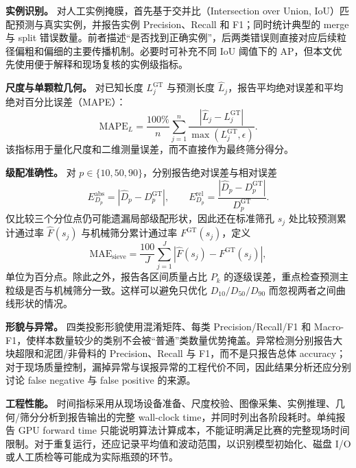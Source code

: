 \textbf{实例识别。} 对人工实例掩膜，首先基于交并比（Intersection over Union, IoU）匹配预测与真实实例，并报告实例 Precision、Recall 和 F1；同时统计典型的 merge 与 split 错误数量。前者描述“是否找到正确实例”，后两类错误则直接对应后续粒径偏粗和偏细的主要传播机制。必要时可补充不同 IoU 阈值下的 AP，但本文优先使用便于解释和现场复核的实例级指标。

\textbf{尺度与单颗粒几何。} 对已知长度 $L_j^{\mathrm{GT}}$ 与预测长度 $\widehat{L}_j$，报告平均绝对误差和平均绝对百分比误差（MAPE）：
\begin{equation}
 \mathrm{MAPE}_{L}=\frac{100\%}{n}\sum_{j=1}^{n}
 \frac{|\widehat{L}_j-L_j^{\mathrm{GT}}|}{\max(L_j^{\mathrm{GT}},\epsilon)}.
 \label{eq:metric-length-mape}
\end{equation}
该指标用于量化尺度和二维测量误差，而不直接作为最终筛分得分。

\textbf{级配准确性。} 对 $p\in\{10,50,90\}$，分别报告绝对误差与相对误差
\begin{equation}
 E_{D_p}^{\mathrm{abs}}=|\widehat{D}_p-D_p^{\mathrm{GT}}|,
 \qquad
 E_{D_p}^{\mathrm{rel}}=
 \frac{|\widehat{D}_p-D_p^{\mathrm{GT}}|}{D_p^{\mathrm{GT}}}.
 \label{eq:metric-d-error}
\end{equation}
仅比较三个分位点仍可能遗漏局部级配形状，因此还在标准筛孔 $s_j$ 处比较预测累计通过率 $\widehat{F}(s_j)$ 与机械筛分累计通过率 $F^{\mathrm{GT}}(s_j)$，定义
\begin{equation}
 \mathrm{MAE}_{\mathrm{sieve}}
 =\frac{100}{J}\sum_{j=1}^{J}
 |\widehat{F}(s_j)-F^{\mathrm{GT}}(s_j)|,
 \label{eq:metric-sieve-mae}
\end{equation}
单位为百分点。除此之外，报告各区间质量占比 $P_k$ 的逐级误差，重点检查预测主粒级是否与机械筛分一致。这样可以避免只优化 $D_{10}/D_{50}/D_{90}$ 而忽视两者之间曲线形状的情况。

\textbf{形貌与异常。} 四类投影形貌使用混淆矩阵、每类 Precision/Recall/F1 和 Macro-F1，使样本数量较少的类别不会被“普通”类数量优势掩盖。异常检测分别报告大块超限和泥团/非骨料的 Precision、Recall 与 F1，而不是只报告总体 accuracy；对于现场质量控制，漏掉异常与误报异常的工程代价不同，因此结果分析还应分别讨论 false negative 与 false positive 的来源。

\textbf{工程性能。} 时间指标采用从现场设备准备、尺度校验、图像采集、实例推理、几何/筛分分析到报告输出的完整 wall-clock time，并同时列出各阶段耗时。单纯报告 GPU forward time 只能说明算法计算成本，不能证明满足比赛的完整现场时间限制。对于重复运行，还应记录平均值和波动范围，以识别模型初始化、磁盘 I/O 或人工质检等可能成为实际瓶颈的环节。

